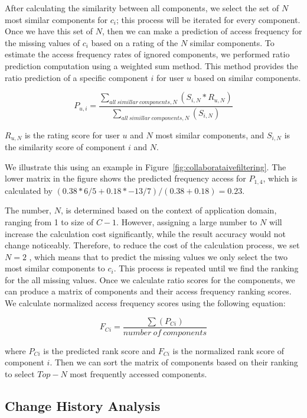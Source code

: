 After calculating the similarity between all components, we select 
the set of $N$ most similar components for $c_{i}$;  
this process will be iterated for every component. 
Once we have this set of $N$, then we can make a prediction of access frequency 
for the missing values of $c_{i}$ based on a rating of the $N$ similar components.
To estimate the access frequency rates of ignored components, we performed
ratio prediction computation using a weighted sum method.
This method provides the ratio prediction of a specific component $i$
for user $u$ based on similar components. 

\vspace*{-3pt}
\[
{P_{u,i} = \frac {\sum_{{all\: simillar\: components , N}}(S_{i,N} * R_{u,N})}
	{\sum_{{all\: simillar\: components, N}}({S_{i,N}})}}
\]

$R_{u,N}$ is the rating score for user $u$ and $N$ most similar components, 
and $S_{i,N}$ is the similarity score of component $i$ and $N$.

We illustrate this using an example in Figure~\ref{fig:collaborataivefiltering}.
The lower matrix in the figure shows the predicted frequency access for $P_{1,4}$, 
which is calculated by $(0.38 * 6/5 + 0.18 * -13/7) / (0.38 + 0.18) = 0.23$.   

The number, $N$, is determined based on the context of application domain, 
ranging from 1 to size of $C - 1$. 
However, assigning a large number to 
$N$ will increase the calculation cost significantly, while the result accuracy would not
change noticeably. Therefore, to reduce the cost of the calculation process, 
we set $N=2$ , 
which means that to predict the missing values we only
select the two most similar components to $c_i$. 
This process is repeated until we find the ranking for the all missing values. 
Once we calculate ratio scores for the components, we can produce a matrix of components
and their access frequency ranking scores.  
We calculate normalized access frequency scores
using the following equation:

\[
{F_{Ci} = \frac {{\sum}(P_{Ci})}
	{{number\: of\: components}}}
\]

where $P_{Ci}$ is the predicted rank score and $F_{Ci}$ is the
normalized rank score of component $i$. 
Then we can sort the matrix of components based on their ranking to 
select $Top-N$  most frequently accessed components.

\vspace*{-3pt}
\subsection{Change History Analysis}
\label{CIA-approach}
\vspace*{-2pt}

